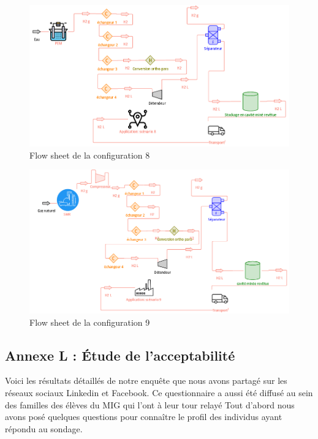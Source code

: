 \documentclass[11pt,french,a4paper]{article}
\begin{document}
\begin{figure}[h]
\centering
\includegraphics[width=0.8\linewidth]{image/annexe/annexe_flow/figure8annexea.png}
\caption{Flow sheet de la configuration 8 }

\end{figure}

\begin{figure}[h]
\centering
\includegraphics[width=0.8\linewidth]{image/annexe/annexe_flow/figure9annexea.png}
\caption{Flow sheet de la configuration 9 }
\end{figure}

\FloatBarrier
\newpage
\subsection*{Annexe L : Étude de l'acceptabilité}

Voici les résultats détaillés de notre enquête que nous avons partagé sur les réseaux sociaux Linkedin et Facebook. Ce questionnaire a aussi été diffusé au sein des familles des élèves du MIG qui l’ont à leur tour relayé
Tout d’abord nous avons posé quelques questions pour connaître le profil des individus ayant répondu au sondage.
\end{document}
